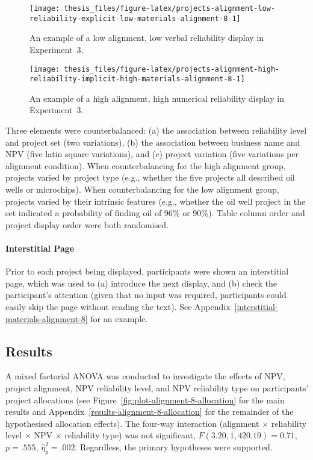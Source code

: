 \documentclass[a4paper, nobind]{templates/ociamthesis}
\theoremstyle{definition}
\theoremstyle{definition}
\theoremstyle{definition}
\theoremstyle{definition}
\theoremstyle{remark}
\begin{document}
\begin{figure}
\texttt{[image: thesis\_files/figure-latex/projects-alignment-low-reliability-explicit-low-materials-alignment-8-1]} \caption{An example of a low alignment, low verbal reliability display in Experiment~3.}\label{fig:projects-alignment-low-reliability-explicit-low-materials-alignment-8}
\end{figure}



\begin{figure}
\texttt{[image: thesis\_files/figure-latex/projects-alignment-high-reliability-implicit-high-materials-alignment-8-1]} \caption{An example of a high alignment, high numerical reliability display in Experiment~3.}\label{fig:projects-alignment-high-reliability-implicit-high-materials-alignment-8}
\end{figure}

Three elements were counterbalanced: (a) the association between reliability
level and project set (two variations), (b) the association between business
name and NPV (five latin square variations), and (c) project variation (five
variations per alignment condition). When counterbalancing for the high
alignment group, projects varied by project type (e.g., whether the five
projects all described oil wells or microchips). When counterbalancing for the
low alignment group, projects varied by their intrinsic features (e.g., whether
the oil well project in the set indicated a probability of finding oil of 96\% or
90\%). Table column order and project display order were both randomised.

\paragraph{Interstitial Page}

Prior to each project being displayed, participants were shown an interstitial
page, which was used to (a) introduce the next display, and (b) check the
participant's attention (given that no input was required, participants could
easily skip the page without reading the text). See
Appendix~\ref{interstitial-materials-alignment-8} for an example.

\subsection{Results}

A mixed factorial ANOVA was conducted to investigate the effects of NPV, project
alignment, NPV reliability level, and NPV reliability type on participants'
project allocations (see Figure~\ref{fig:plot-alignment-8-allocation} for the
main results and Appendix~\ref{results-alignment-8-allocation} for the
remainder of the hypothesised allocation effects). The four-way interaction
(alignment \(\times\) reliability level \(\times\) NPV \(\times\) reliability type)
was not significant, \(F(3.20, 1,420.19) = 0.71\), \(p = .555\), \(\hat{\eta}^2_p = .002\). Regardless,
the primary hypotheses were supported.
\end{document}
